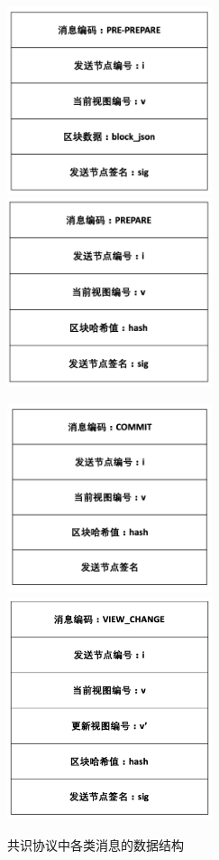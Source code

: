 \begin{figure}[ht]
  \centering%
    {\includegraphics[width=6cm]{figures/pre-prepare.png}}%
  \hspace{2em}%
      {\includegraphics[width=6cm]{figures/prepare.png}}

      {\includegraphics[width=6cm]{figures/commit.png}}
  \hspace{2em}%
      {\includegraphics[width=6cm]{figures/viewchange.png}}
  \caption{共识协议中各类消息的数据结构}
  \label{fig:pbft-data}
\end{figure}

